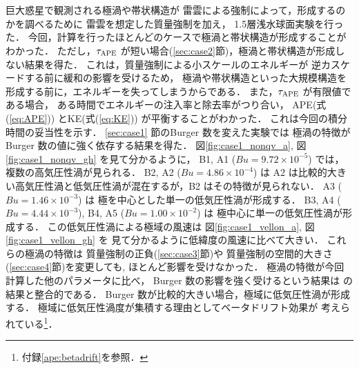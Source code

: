 \documentclass[a4j,12pt,openbib,oneside]{jreport}
\begin{document}
\chapter{}
\label{chap:4}
%
%
巨大惑星で観測される極渦や帯状構造が
雷雲による強制によって，形成するのかを調べるために
雷雲を想定した質量強制を加え，
1.5層浅水球面実験を行った．
%
今回，計算を行ったほとんどのケースで極渦と帯状構造が形成することがわかった．
%
ただし，$\tau_{\rm{APE}}$ が短い場合(\ref{sec:case2}節)，極渦と帯状構造が形成しない結果を得た．
これは，質量強制による小スケールのエネルギーが
逆カスケードする前に緩和の影響を受けるため，
極渦や帯状構造といった大規模構造を
形成する前に，エネルギーを失ってしまうからである．
また，$\tau_{\rm{APE}}$ が有限値である場合，
ある時間でエネルギーの注入率と除去率がつり合い，
APE(式(\ref{eq:APE})) とKE(式(\ref{eq:KE})) が平衡することがわかった．
これは今回の積分時間の妥当性を示す．
%
%
\ref{sec:case1} 節のBurger 数を変えた実験では
極渦の特徴がBurger 数の値に強く依存する結果を得た．
%
図\ref{fig:case1_nonqv_a}, 図\ref{fig:case1_nonqv_gh} を見て分かるように，
B1, A1 ($Bu = 9.72\times 10^{-5}$) では，
複数の高気圧性渦が見られる．
%
B2, A2 ($Bu = 4.86\times 10^{-4}$) は
A2 は比較的大きい高気圧性渦と低気圧性渦が混在するが，B2 はその特徴が見られない．
%
A3 ($Bu = 1.46\times 10^{-3}$) は
極を中心とした単一の低気圧性渦が形成する．
%
B3, A4 ($Bu = 4.44 \times 10^{-3}$), 
B4, A5 ($Bu = 1.00 \times 10^{-2}$) は
極中心に単一の低気圧性渦が形成する．
この低気圧性渦による極域の風速は
図\ref{fig:case1_vellon_a}, 図\ref{fig:case1_vellon_gh} を
見て分かるように低緯度の風速に比べて大きい．
%
これらの極渦の特徴は
質量強制の正負(\ref{sec:case3}節)や
質量強制の空間的大きさ(\ref{sec:case4}節)を変更しても, 
ほとんど影響を受けなかった．
% 
極渦の特徴が今回計算した他のパラメータに比べ，
Burger 数の影響を強く受けるという結果は
\cite{Brueshaber2019} の結果と整合的である．
%
Burger 数が比較的大きい場合，極域に低気圧性渦が形成する．
極域に低気圧性渦度が集積する理由としてベータドリフト効果が
考えられている\footnote{付録\ref{ape:betadrift}を参照．}．
%
\end{document}
